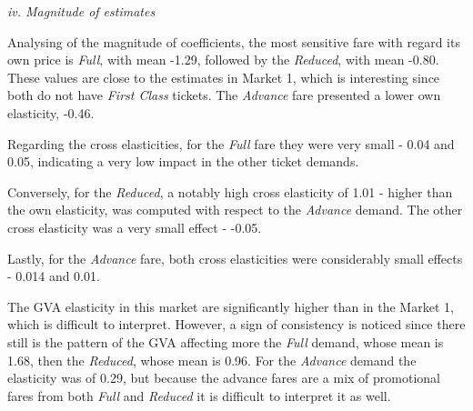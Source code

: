 
\textit{iv. Magnitude of estimates}

Analysing of the magnitude of coefficients, the most sensitive fare with regard its own price is \textit{Full}, with mean -1.29, followed by the \textit{Reduced}, with mean -0.80. These values are close to the estimates in Market 1, which is interesting since both do not have \textit{First Class} tickets. The \textit{Advance} fare presented a lower own elasticity, -0.46.

Regarding the cross elasticities, for the \textit{Full} fare they were very small - 0.04 and 0.05, indicating a very low impact in the other ticket demands. 

Conversely, for the \textit{Reduced}, a notably high cross elasticity of 1.01 - higher than the own elasticity, was computed with respect to the \textit{Advance} demand. The other cross elasticity was a very small effect - -0.05.

Lastly, for the \textit{Advance} fare, both cross elasticities were considerably small effects - 0.014 and 0.01.



The GVA elasticity in this market are significantly higher than in the Market 1, which is difficult to interpret. However, a sign of consistency is noticed since there still is the pattern of the GVA affecting more the \textit{Full} demand, whose mean is 1.68, then the \textit{Reduced}, whose mean is 0.96. For the \textit{Advance} demand the elasticity was of 0.29, but because the advance fares are a mix of promotional fares from both \textit{Full} and \textit{Reduced} it is difficult to interpret it as well.

